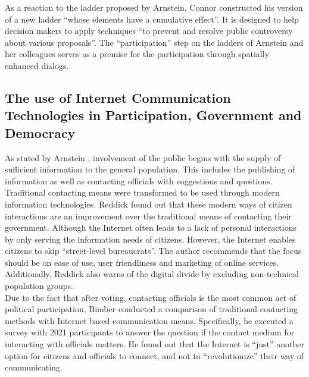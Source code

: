 As a reaction to the ladder proposed by Arnstein, Connor \cite{Connor1988_new_ladder} constructed his version of a new ladder ``whose elements have a cumulative effect''. It is designed to help decision makers to apply techniques ``to prevent and resolve public controversy about various proposals''. The ``participation'' step on the ladders of Arnstein and her colleagues serves as a premise for the participation through spatially enhanced dialogs.%

\subsection{The use of Internet Communication Technologies in Participation, Government and Democracy}
As stated by Arnstein \cite{Arnstein1969_citizen_participation}, involvement of the public begins with the supply of sufficient information to the general population. This includes the publishing of information as well as contacting officials with suggestions and questions. Traditional contacting means were transformed to be used through modern information technologies. Reddick \cite{Reddick2005_Citizen_interaction_with_egovernment} found out that these modern ways of citizen interactions are an improvement over the traditional means of contacting their government. Although the Internet often leads to a lack of personal interactions by only serving the information needs of citizens. However, the Internet enables citizens to skip ``street-level bureaucrats''. The author recommends that the focus should be on ease of use, user friendliness and marketing of online services. Additionally, Reddick also warns of the digital divide by excluding non-technical population groups.\\
Due to the fact that after voting, contacting officials is the most common act of political participation, Bimber \cite{Bimber1999_Citizen_communication_with_government} conducted a comparison of traditional contacting methods with Internet based communication means. Specifically, he executed a survey with 2021 participants to answer the question if the contact medium for interacting with officials matters. He found out that the Internet is ``just'' another option for citizens and officials to connect, and not to ``revolutionize'' their way of communicating.\\
